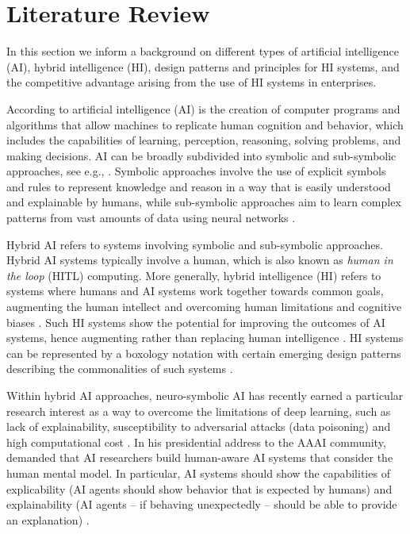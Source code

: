 \section{Literature Review}
\label{sec:literature}

In this section we inform a background on different types of artificial intelligence (AI), hybrid intelligence (HI), 
design patterns and principles for HI systems, and the competitive advantage arising from the use of HI systems in
enterprises.

According to \cite{russel2010} artificial intelligence (AI) is the creation of computer programs and algorithms
that allow machines to replicate human cognition and behavior, which includes the capabilities of learning, perception,
reasoning, solving problems, and making decisions. AI can be broadly subdivided into symbolic and sub-symbolic approaches,
see e.g., \cite{eliasmithSymbolicSubsymbolic2006}. Symbolic approaches involve the use of explicit symbols and rules to 
represent knowledge and reason in a way that is easily understood and explainable by humans, while sub-symbolic
approaches aim to learn complex patterns from vast amounts of data using neural networks
\citep{ilkouSymbolicVsSubsymbolic2020}.

Hybrid AI refers to systems involving symbolic and sub-symbolic approaches. Hybrid AI systems typically involve
a human, which is also known as \textit{human in the loop} (HITL) computing. More generally, hybrid intelligence (HI)
refers to systems where humans and AI systems work together towards common goals, augmenting the human intellect
and overcoming human limitations and cognitive biases \citep{akataResearchAgendaHybrid2020}. Such HI systems show
the  potential for improving the outcomes of AI systems, hence augmenting rather than replacing human intelligence
\cite[p. 19]{akataResearchAgendaHybrid2020}. HI systems can be represented by a boxology notation with certain
emerging design patterns describing the commonalities of such systems \citep{harmelenBoxologyDesignPatterns2019,
vanbekkumModularDesignPatterns2021,witschelVisualizationPatternsHybrid2021}.

Within hybrid AI approaches, neuro-symbolic AI has recently earned a particular research interest as a way to
overcome the limitations of deep learning, such as lack of explainability, susceptibility to adversarial attacks
(data poisoning) and high computational cost \citep{garcezNeurosymbolicAI3rd2020}. In his presidential address to
the AAAI community, \cite{kambhampatiChallengesHumanAwareAI2020} demanded that AI researchers build human-aware AI
systems that consider the human mental model. In particular, AI systems should show the capabilities of explicability
(AI agents should show behavior that is expected by humans) and explainability (AI agents -- if behaving unexpectedly
-- should be able to provide an explanation) \citep{kambhampatiChallengesHumanAwareAI2020}.

